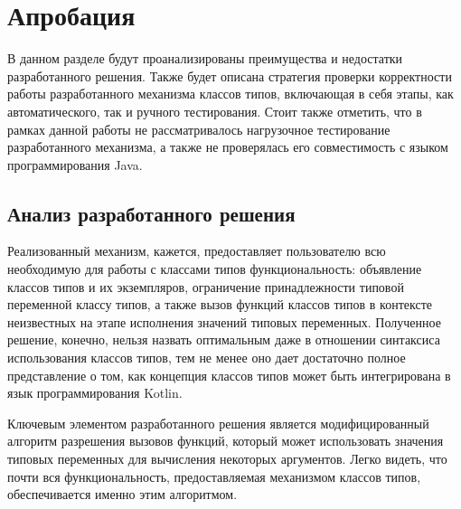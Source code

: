 \chapter{Апробация}

В данном разделе будут проанализированы преимущества и недостатки разработанного решения. Также будет описана стратегия проверки корректности работы разработанного механизма классов типов, включающая в себя этапы, как автоматического, так и ручного тестирования. Стоит также отметить, что в рамках данной работы не рассматривалось нагрузочное тестирование разработанного механизма, а также не проверялась его совместимость с языком программирования Java. 

\section{Анализ разработанного решения}

Реализованный механизм, кажется, предоставляет пользователю всю необходимую для работы с классами типов функциональность: объявление классов типов и их экземпляров, ограничение принадлежности типовой переменной классу типов, а также вызов функций классов типов в контексте неизвестных на этапе исполнения значений типовых переменных. Полученное решение, конечно, нельзя назвать оптимальным даже в отношении синтаксиса использования классов типов, тем не менее оно дает достаточно полное представление о том, как концепция классов типов может быть интегрирована в язык программирования Kotlin. 

Ключевым элементом разработанного решения является модифицированный алгоритм разрешения вызовов функций, который может использовать значения типовых переменных для вычисления некоторых аргументов. Легко видеть, что почти вся функциональность, предоставляемая механизмом классов типов, обеспечивается именно этим алгоритмом. 

